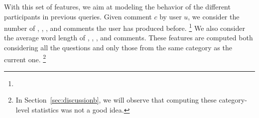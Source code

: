 With this set of features, we aim at modeling the behavior of the different 
participants in previous queries. Given comment $c$ by user $u$, we consider 
the number of \good, \bad, \pot, and \dial comments the user has produced 
before. 
\footnote{}
We also consider the average word length of \good, \bad, \pot, and \dial 
comments. These features are computed both considering all the questions and 
only those from the same category as the current one.%
\footnote{In Section~\ref{sec:discussionb}, we will observe that computing 
these category-level statistics was not a good idea.}





